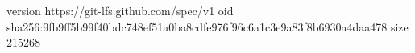 version https://git-lfs.github.com/spec/v1
oid sha256:9fb9ff5b99f40bdc748ef51a0ba8cdfe976f96c6a1c3e9a83f8b6930a4daa478
size 215268
